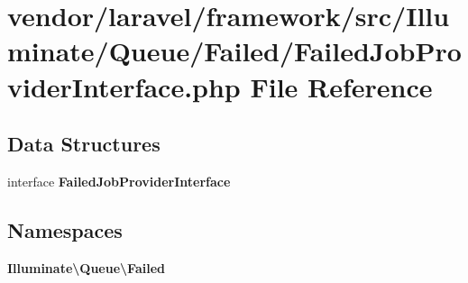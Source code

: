 \section{vendor/laravel/framework/src/\+Illuminate/\+Queue/\+Failed/\+Failed\+Job\+Provider\+Interface.php File Reference}
\label{_failed_job_provider_interface_8php}
\subsection*{Data Structures}
\begin{DoxyCompactItemize}
\item 
interface {\bf Failed\+Job\+Provider\+Interface}
\end{DoxyCompactItemize}
\subsection*{Namespaces}
\begin{DoxyCompactItemize}
\item 
 {\bf Illuminate\textbackslash{}\+Queue\textbackslash{}\+Failed}
\end{DoxyCompactItemize}
